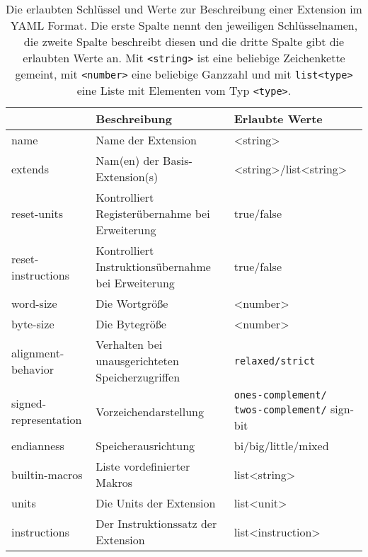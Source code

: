 \begin{table}[p]
  \centering
  \small
  \begin{tabular}{>{\ttfamily}l p{8.3cm} >{\ttfamily}p{3.5cm}}
    {\normalfont\bfseries Schlüssel} & \textbf{Beschreibung} & \textbf{Erlaubte Werte}\\
    \toprule
    name & Name der Extension & <string> \\

    extends & Nam(en) der Basis-Extension(s) & <string>/list<string>\\

    reset-units & Kontrolliert Registerübernahme bei Erweiterung & true/false\\

    reset-instructions & Kontrolliert Instruktionsübernahme bei Erweiterung & true/false\\

    word-size & Die Wortgröße & <number>\\

    byte-size & Die Bytegröße & <number>\\

    alignment-behavior & Verhalten bei unausgerichteten Speicherzugriffen & \texttt{relaxed/strict}\\

    signed-representation & Vorzeichendarstellung & \texttt{ones-complement/} \texttt{twos-complement/} sign-bit \\

    endianness & Speicherausrichtung & bi/big/little/mixed \\

    builtin-macros & Liste vordefinierter Makros & list<string> \\

    units & Die Units der Extension & list<unit> \\

    instructions & Der Instruktionssatz der Extension & list<instruction>
  \end{tabular}
  \caption{Die erlaubten Schlüssel und Werte zur Beschreibung einer Extension im YAML Format. Die erste Spalte nennt den jeweiligen Schlüsselnamen, die zweite Spalte beschreibt diesen und die dritte Spalte gibt die erlaubten Werte an. Mit \texttt{<string>} ist eine beliebige Zeichenkette gemeint, mit \texttt{<number>} eine beliebige Ganzzahl und mit \texttt{list<type>} eine Liste mit Elementen vom Typ \texttt{<type>}.}
  \label{tbl:isa-top-keys}


\end{table}
